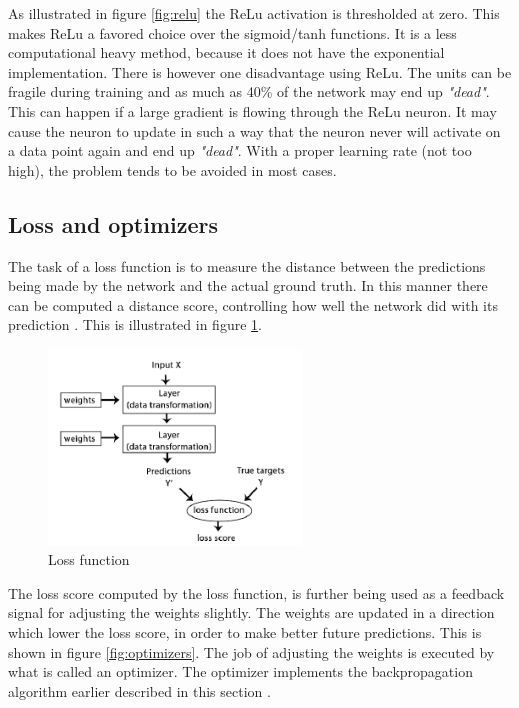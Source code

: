 \documentclass[USenglish]{ifimaster}  %
\begin{document}
As illustrated in figure \cref{fig:relu} the ReLu activation is thresholded at zero. This makes ReLu a favored choice over the sigmoid/tanh functions. It is a less computational heavy method, because it does not have the exponential implementation. There is however one disadvantage using ReLu. The units can be fragile during training and as much as 40\% of the network may end up \textit{"dead"}. This can happen if a large gradient is flowing through the ReLu neuron. It may cause the neuron to update in such a way that the neuron never will activate on a data point again and end up \textit{"dead"}. With a proper learning rate (not too high), the problem tends to be avoided in most cases.

\subsection{Loss and optimizers}
The task of a loss function is to measure the distance between the predictions being made by the network and the actual ground truth. In this manner there can be computed a distance score, controlling how well the network did with its prediction \cite{Francois_Deep_learning_with_python}. This is illustrated in figure \cref{fig:loss_function}.

\begin{figure}[H]
    \centering
    \includegraphics[width=0.6\textwidth]{bilder/loss_function.png}
    \caption{Loss function \cite{Francois_Deep_learning_with_python}}
    \label{fig:loss_function}
\end{figure}

The loss score computed by the loss function, is further being used as a feedback signal for adjusting the weights slightly. The weights are updated in a direction which lower the loss score, in order to make better future predictions. This is shown in figure \cref{fig:optimizers}. The job of adjusting the weights is executed by what is called an optimizer. The optimizer implements the backpropagation algorithm earlier described in this section \cite{Francois_Deep_learning_with_python}. 
\end{document}
